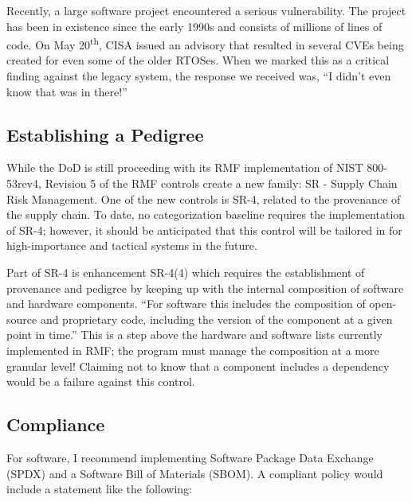 Recently, a large software project encountered a serious vulnerability. The project has been in existence since the early 1990s and consists of millions of lines of code. On May 20\textsuperscript{th}, CISA issued an advisory that resulted in several CVEs being created for even some of the older RTOSes.\autocite{20210628:ics21-119-04} When we marked this as a critical finding against the legacy system, the response we received was, ``I didn't even know that was in there!''

\subsection{Establishing a Pedigree}

While the DoD is still proceeding with its RMF implementation of NIST 800-53rev4, Revision 5 of the RMF controls create a new family: SR - Supply Chain Risk Management. One of the new controls is SR-4, related to the provenance of the supply chain. To date, no categorization baseline requires the implementation of SR-4; however, it should be anticipated that this control will be tailored in for high-importance and tactical systems in the future. 

Part of SR-4 is enhancement SR-4(4) which requires the establishment of provenance and pedigree by keeping up with the internal composition of software and hardware components. ``For software this includes the composition of open-source and proprietary code, including the version of the component at a given point in time.''\autocite[\pno~]{20210628:nist80053rev5} This is a step above the hardware and software lists currently implemented in RMF; the program must manage the composition at a more granular level! Claiming not to know that a component includes a dependency would be a failure against this control.

\subsection{Compliance}

For software, I recommend implementing Software Package Data Exchange (SPDX) and a Software Bill of Materials (SBOM). A compliant policy would include a statement like the following:

